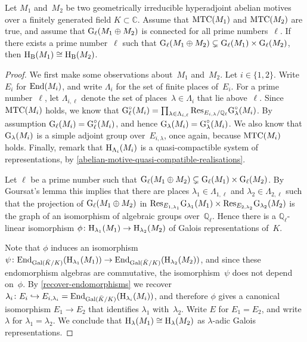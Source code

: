 \documentclass[10pt,twoside,leqno]{article}
\numberwithin{equation}{subsection}
\newcommand{\into}{\hookrightarrow}
\newcommand{\End}{\textnormal{End}}
\newcommand{\QQ}{\mathbb{Q}}
\newcommand{\QQl}{\QQ_{\ell}}
\newcommand{\CC}{\mathbb{C}}
\newcommand{\Gal}{\textnormal{Gal}}
\newcommand{\HH}{\textnormal{H}}
\newcommand{\Hlambda}{\HH_{\lambda}}
\newcommand{\HB}{\HH_{\textnormal{B}}}
\newcommand{\GG}{\textnormal{G}}
\newcommand{\Gl}{\GG_{\ell}}
\newcommand{\Glc}{\Gl^{\circ}}
\newcommand{\Glambda}{\GG_{\lambda}}
\newcommand{\Glambdac}{\Glambda^{\circ}}
\newcommand{\Res}{\textnormal{Res}}
\newcommand{\MTC}{\textnormal{MTC}}
\begin{document}
\begin{proposition} %
 \label{mtc-product-abelian-motives}
 Let $M_1$ and~$M_2$ be two
 geometrically irreducible hyperadjoint abelian motives
 over a finitely generated field $K \subset \CC$.
 Assume that $\MTC(M_1)$ and $\MTC(M_2)$ are true, and
 assume that $\Gl(M_1 \oplus M_2)$ is connected for all prime numbers~$\ell$.
 If there exists a prime number~$\ell$
 such that $\Gl(M_1 \oplus M_2) \subsetneq \Gl(M_1) \times \Gl(M_2)$,
 then $\HB(M_1) \cong \HB(M_2)$.
 \begin{proof}
  We first make some observations about~$M_1$ and~$M_2$.
  Let $i \in \{1,2\}$.
  Write $E_i$ for $\End(M_i)$, and
  write $\Lambda_i$ for the set of finite places of~$E_i$.
  For a prime number~$\ell$, let $\Lambda_{i,\ell}$
  denote the set of places~$\lambda \in \Lambda_i$ that lie above~$\ell$.
  Since $\MTC(M_i)$ holds, we know that
  $\Glc(M_i) = \prod_{\lambda \in \Lambda_{i,\ell}}
  \Res_{E_{i,\lambda}/\QQl} \Glambdac(M_i)$.
  By assumption $\Gl(M_i) = \Glc(M_i)$,
  and hence $\Glambda(M_i) = \Glambdac(M_i)$.
  We also know that
  $\Glambda(M_i)$ is a simple adjoint group over~$E_{i,\lambda}$,
  once again, because $\MTC(M_i)$ holds.
  Finally, remark that $\HH_{\Lambda_i}(M_i)$ is a
  quasi-compactible system of representations,
  by \cref{abelian-motive-quasi-compatible-realisations}.

  Let $\ell$ be a prime number
  such that $\Gl(M_1 \oplus M_2) \subsetneq \Gl(M_1) \times \Gl(M_2)$.
  By Goursat's lemma this implies that there are
  places $\lambda_1 \in \Lambda_{1,\ell}$
  and $\lambda_2 \in \Lambda_{2,\ell}$
  such that the projection of $\Gl(M_1 \oplus M_2)$ in
  $\Res_{E_{1,\lambda_1}} \GG_{\lambda_1}(M_1) \times
  \Res_{E_{2,\lambda_2}} \GG_{\lambda_2}(M_2)$
  is the graph of an isomorphism of algebraic groups over~$\QQl$.
  Hence there is a $\QQl$-linear isomorphism
  $\phi \colon \HH_{\lambda_1}(M_1) \to \HH_{\lambda_2}(M_2)$
  of Galois representations of~$K$.

  Note that $\phi$ induces an isomorphism
  $\psi \colon \End_{\Gal(\bar{K}/K)}(\HH_{\lambda_1}(M_1)) \to
  \End_{\Gal(\bar{K}/K)}(\HH_{\lambda_2}(M_2))$,
  and since these endomorphism algebras are commutative,
  the isomorphism~$\psi$ does not depend on~$\phi$.
  By \cref{recover-endomorphisms} we recover
  $\lambda_i \colon E_i \into E_{i,\lambda_i} =
  \End_{\Gal(\bar{K}/K)}(\HH_{\lambda_i}(M_i))$,
  and therefore $\phi$ gives a canonical isomorphism
  $E_1 \to E_2$ that identifies $\lambda_1$ with~$\lambda_2$.
  Write $E$ for $E_1 = E_2$,
  and write $\lambda$ for $\lambda_1 = \lambda_2$.
  We conclude that $\Hlambda(M_1) \cong \Hlambda(M_2)$
  as $\lambda$-adic Galois representations.


\end{proof}
\end{proposition}
\end{document}
